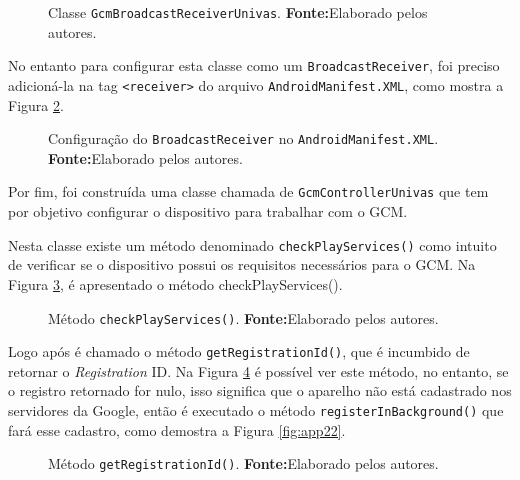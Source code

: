 	\begin{figure}[h!] 
		
		\caption[Classe GcmBroadcastReceiverUnivas]{Classe
		\texttt{GcmBroadcastReceiverUnivas}.
		\textbf{Fonte:}Elaborado pelos autores.}
		\label{fig:app18}
	\end{figure}
		
	\par No entanto para configurar esta classe como um \texttt{BroadcastReceiver},
foi preciso adicioná-la na tag \texttt{<receiver>} do arquivo
\texttt{AndroidManifest.XML}, como mostra a Figura \ref{fig:app19}.

	\begin{figure}[h!] 
		
		\caption[Configuração do BroadcastReceiver no
		AndroidManifest.XML]{Configuração do \texttt{BroadcastReceiver} no
		\texttt{AndroidManifest.XML}.
		\textbf{Fonte:}Elaborado pelos autores.}
		\label{fig:app19}
	\end{figure}

	\par Por fim, foi construída uma classe chamada de \texttt{GcmControllerUnivas}
que tem por objetivo configurar o dispositivo para trabalhar com o GCM.

	\par Nesta classe existe um método denominado \texttt{checkPlayServices()} como
intuito de verificar se o dispositivo possui os requisitos necessários para o
GCM. Na Figura \ref{fig:app20}, é apresentado o método checkPlayServices().

	\begin{figure}[h!] 
		
		\caption[Método checkPlayServices()]{Método \texttt{checkPlayServices()}.
		\textbf{Fonte:}Elaborado pelos autores.}
		\label{fig:app20}
	\end{figure}
	
	\par Logo após é chamado o método \texttt{getRegistrationId()}, que é incumbido
de retornar o \textit{Registration} ID. Na Figura \ref{fig:app21} é possível ver
este método, no entanto, se o registro retornado for nulo, isso significa que o
aparelho não está cadastrado nos servidores da Google, então é executado o
método \texttt{registerInBackground()} que fará esse cadastro, como demostra a
Figura \ref{fig:app22}.

	\begin{figure}[h!] 
		
		\caption[Método getRegistrationId()]{Método \texttt{getRegistrationId()}.
		\textbf{Fonte:}Elaborado pelos autores.}
		\label{fig:app21}
	\end{figure}
	
